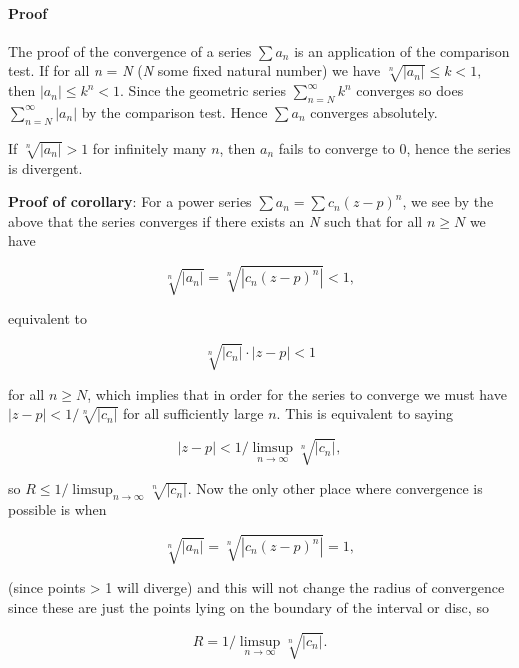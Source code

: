 \paragraph{Proof}



The proof of the convergence of a series $\sum a _n$ is an application of the comparison test. If for all \textit{n} = \textit{N} (\textit{N} some fixed natural number) we have $\sqrt[n]{|a _n|} \le k < 1,$ then $|a _n| \le k^n < 1$. Since the geometric series $\sum _{n=N}^\infty k^n$ converges so does $\sum _{n=N}^\infty |a _n|$ by the comparison test. Hence $\sum a _n$ converges absolutely.



If $\sqrt[n]{|a _n|} > 1$ for infinitely many $n$, then $a _n$ fails to converge to 0, hence the series is divergent.



\textbf{Proof of corollary}: For a power series $\sum a _n = \sum c _n (z - p)^n$, we see by the above that the series converges if there exists an \textit{N} such that for all $n \geq N$ we have



$$\sqrt[n]{|a _n|} = \sqrt[n]{|c _n(z - p)^n|} < 1,$$



equivalent to



$$\sqrt[n]{|c _n|}\cdot|z - p| < 1$$



for all $n \geq N$, which implies that in order for the series to converge we must have $|z - p| < 1/\sqrt[n]{|c _n|}$ for all sufficiently large $n$. This is equivalent to saying



$$|z - p| < 1/\limsup _{n \rightarrow \infty}{\sqrt[n]{|c _n|}},$$



so $R \le 1/\limsup _{n \rightarrow \infty}{\sqrt[n]{|c _n|}}.$ Now the only other place where convergence is possible is when



$$\sqrt[n]{|a _n|} = \sqrt[n]{|c _n(z - p)^n|} = 1,$$



(since points > 1 will diverge) and this will not change the radius of convergence since these are just the points lying on the boundary of the interval or disc, so



$$R = 1/\limsup _{n \rightarrow \infty}{\sqrt[n]{|c _n|}}.$$



